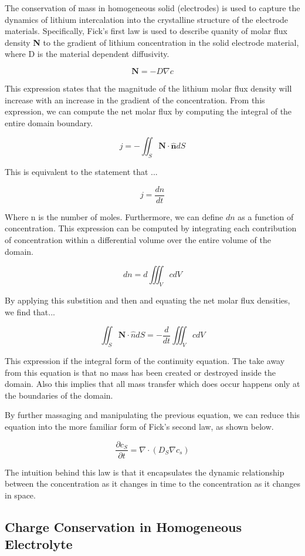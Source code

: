\documentclass[lettersize,journal]{IEEEtran}
\begin{document}
The conservation of mass in homogeneous solid (electrodes) is used to capture the dynamics of lithium intercalation into the crystalline structure of the electrode materials. Specifically, Fick's first law is used to describe quanity of molar flux density \textbf{N} to the gradient of lithium concentration in the solid electrode material, where D is the material dependent diffusivity.

\[
\textbf{N} =  -D \nabla c
\]

This expression states that the magnitude of the lithium molar flux density will increase with an increase in the gradient of the concentration. From this expression, we can compute the net molar flux by computing the integral of the entire domain boundary.

\[
 j = -\iint_{S} \textbf{N} \cdot \hat{\textbf{n}}dS
\]

This is equivalent to the statement that ...

\[
j = \frac{dn}{dt}
\]

Where n is the number of moles. Furthermore, we can define $dn$ as a function of concentration. This expression can be computed by integrating each contribution of concentration within a differential volume over the entire volume of the domain.

\[
dn = d \iiint_V cdV
\]

By applying this substition and then and equating the net molar flux densities, we find that...

\[
\iint_S \textbf{N} \cdot \hat{n}dS = -\frac{d}{dt} \iiint_V c dV
\]

This expression if the integral form of the continuity equation. The take away from this equation is that no mass has been created or destroyed inside the domain. Also this implies that all mass transfer which does occur happens only at the boundaries of the domain.

By further massaging and manipulating the previous equation, we can reduce this equation into the more familiar form of Fick's second law, as shown below.

\[
\frac{\partial c_{S}}{\partial t} = \nabla \cdot \left( D_{S} \nabla c_{s} \right)
\]

The intuition behind this law is that it encapsulates the dynamic relationship between the concentration as it changes in time to the concentration as it changes in space.


\subsection{Charge Conservation in Homogeneous Electrolyte}
\end{document}
